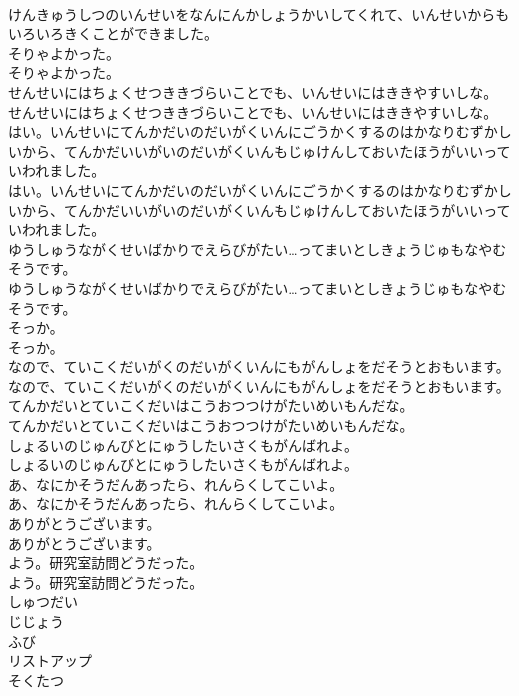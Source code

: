 \documentclass[8pt]{extreport}
\begin{document}
\begin{CJK}{UTF8}{min}
\\	けんきゅうしつのいんせいをなんにんかしょうかいしてくれて、いんせいからもいろいろきくことができました。 
\\	そりゃよかった。	
\\	そりゃよかった。 
\\	せんせいにはちょくせつききづらいことでも、いんせいにはききやすいしな。	
\\	せんせいにはちょくせつききづらいことでも、いんせいにはききやすいしな。 
\\	はい。いんせいにてんかだいのだいがくいんにごうかくするのはかなりむずかしいから、てんかだいいがいのだいがくいんもじゅけんしておいたほうがいいっていわれました。	
\\	はい。いんせいにてんかだいのだいがくいんにごうかくするのはかなりむずかしいから、てんかだいいがいのだいがくいんもじゅけんしておいたほうがいいっていわれました。 
\\	ゆうしゅうながくせいばかりでえらびがたい…ってまいとしきょうじゅもなやむそうです。	
\\	ゆうしゅうながくせいばかりでえらびがたい…ってまいとしきょうじゅもなやむそうです。 
\\	そっか。	
\\	そっか。 
\\	なので、ていこくだいがくのだいがくいんにもがんしょをだそうとおもいます。	
\\	なので、ていこくだいがくのだいがくいんにもがんしょをだそうとおもいます。 
\\	てんかだいとていこくだいはこうおつつけがたいめいもんだな。	
\\	てんかだいとていこくだいはこうおつつけがたいめいもんだな。 
\\	しょるいのじゅんびとにゅうしたいさくもがんばれよ。	
\\	しょるいのじゅんびとにゅうしたいさくもがんばれよ。 
\\	あ、なにかそうだんあったら、れんらくしてこいよ。	
\\	あ、なにかそうだんあったら、れんらくしてこいよ。 
\\	ありがとうございます。	
\\	ありがとうございます。 
\\	よう。研究室訪問どうだった。	
\\	よう。研究室訪問どうだった。 
\\	しゅつだい
\\	じじょう
\\	ふび
\\	リストアップ
\\	そくたつ

\end{CJK}
\end{document}
